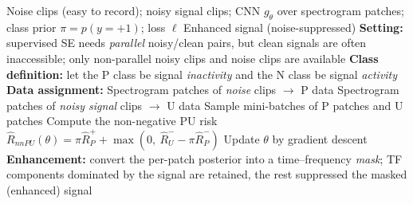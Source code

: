 \documentclass{article}
\begin{document}
\begin{algorithm}[!h]
\renewcommand{\algorithmicrequire}{\textbf{Input:}} %
\renewcommand{\algorithmicensure}{\textbf{Output:}} %
	\caption{PULSE: audio signal enhancement by PU learning on spectrogram patches} %
	\begin{algorithmic}[1] %
	    \REQUIRE
	    Noise clips (easy to record); noisy signal clips;
	    CNN $g_{\theta}$ over spectrogram patches; class prior $\pi=p(y=+1)$;
	    loss $\ell$
	    \ENSURE
	    Enhanced signal (noise-suppressed)
	    \STATE \textbf{Setting:} supervised SE needs \emph{parallel} noisy/clean pairs, but clean
	    signals are often inaccessible; only non-parallel noisy clips and noise clips are available %
	    \STATE \textbf{Class definition:} let the P class be signal \emph{inactivity} and the N class
	    be signal \emph{activity} %
	    \STATE \textbf{Data assignment:}
	    \STATE \quad Spectrogram patches of \emph{noise} clips $\rightarrow$ P data %
	    \STATE \quad Spectrogram patches of \emph{noisy signal} clips $\rightarrow$ U data %
	    \STATE Sample mini-batches of P patches and U patches
	    \STATE Compute the non-negative PU risk
	    $\hat{R}_{nnPU}(\theta)=\pi\hat{R}_{P}^{+}+\max\!\left(0,\ \hat{R}_{U}^{-}-\pi\hat{R}_{P}^{-}\right)$ %
	    \STATE Update $\theta$ by gradient descent
	    \ENDWHILE
	    \STATE \textbf{Enhancement:} convert the per-patch posterior into a time--frequency
	    \emph{mask}; TF components dominated by the signal are retained, the rest suppressed %
		\RETURN the masked (enhanced) signal
	\end{algorithmic}
\end{algorithm}
\end{document}
